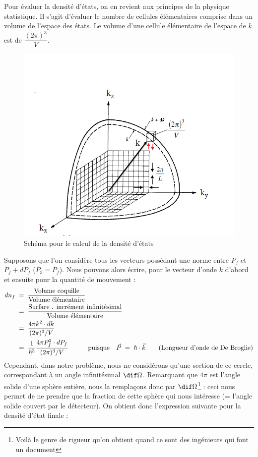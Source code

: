 Pour évaluer la densité d'états, on en revient aux principes de la physique statistique. Il s'agit d'évaluer le nombre de cellules élémentaires comprise dans un volume de l'espace des états. Le volume d'une cellule élémentaire de l'espace de $k$ est de $\dfrac{(2\pi)^3}{V}$.
 \begin{figure}[H]
    \centering
    \includegraphics[scale=0.80]{Images4/dens.PNG}
    \caption{Schéma pour le calcul de la densité d'états}
    \label{fig:Densité d'états}
\end{figure}
Supposons que l'on considère tous les vecteurs possédant une norme entre $P_f$ et $P_f + dP_f$ ($P_3 = P_f$). Nous pouvons alors écrire, pour le vecteur d'onde $k$ d'abord et ensuite pour la quantité de mouvement :
\begin{align*}
    dn_f 
        &\; = \; 
    \dfrac{\text{Volume coquille}}{\text{Volume élémentaire}}\\
        &\; = \;
    \dfrac{\text{Surface . incrément infinitésimal}}{\text{Volume élémentaire}}\\
        &\; = \;
    \dfrac{4\pi k^2 \cdot dk}{(2\pi)^3 / V}\\
        &\; = \;
    \dfrac{1}{\hbar^3}\dfrac{4\pi P^{2}_f \cdot dP_f}{(2\pi)^3 / V} 
    \qquad \quad \text{puisque} \quad
    \vec{P} \; = \; \hbar \cdot \vec{k} \qquad \text{(Longueur d'onde de De Broglie)}
\end{align*}
Cependant, dans notre problème, nous ne considérons qu'une section de ce cercle, correspondant à un angle infinitésimal $\dif\Omega$. Remarquant que $4\pi$ est l'angle solide d'une sphère entière, nous la remplaçons donc par $\dif\Omega$\footnote{Voilà le genre de rigueur qu'on obtient quand ce sont des ingénieurs qui font un document} : ceci nous permet de ne prendre que la fraction de cette sphère qui nous intéresse (= l'angle solide couvert par le détecteur). On obtient donc l'expression suivante pour la densité d'état finale : 
